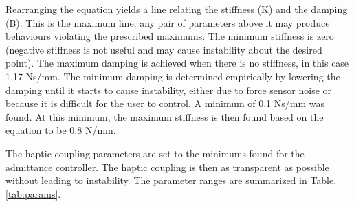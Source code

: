 \documentclass[12pt]{report}
\begin{document}
	Rearranging the equation yields a line relating the stiffness (K) and the damping (B). This is the maximum line, any pair of parameters above it may produce behaviours violating the prescribed maximums. The minimum stiffness is zero (negative stiffness is not useful and may cause instability about the desired point). The maximum damping is achieved when there is no stiffness, in this case 1.17 Ns/mm. The minimum damping is determined empirically by lowering the damping until it starts to cause instability, either due to force sensor noise or because it is difficult for the user to control. A minimum of 0.1 Ns/mm was found. At this minimum, the maximum stiffness is then found based on the equation to be 0.8 N/mm. 
	

	
	The haptic coupling parameters are set to the minimums found for the admittance controller. The haptic coupling is then as transparent as possible without leading to instability. The parameter ranges are summarized in Table. \ref{tab:params}. 
	
		
\end{document}
